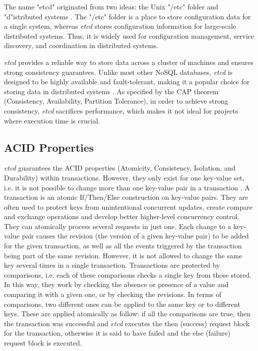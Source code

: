 \documentclass[screen,review]{acmart}
\begin{document}
The name "etcd" originated from two ideas: the Unix "/etc" folder and "d"istributed systems \cite{dbdb}. The "/etc" folder is a place to store configuration data for a single system, whereas \textit{etcd} stores configuration information for large-scale distributed systems. Thus, it is widely used for configuration management, service discovery, and coordination in distributed systems.

\textit{etcd} provides a reliable way to store data across a cluster of machines and ensures strong consistency guarantees. Unlike most other NoSQL databases, \textit{etcd} is designed to be highly available and fault-tolerant, making it a popular choice for storing data in distributed systems \cite{ibm} \cite{etcd_overview}. As specified by the CAP theorem \cite{ibm_CAP} (Consistency, Availability, Partition Tolerance), in order to achieve strong consistency, \textit{etcd} sacrifices performance, which makes it not ideal for projects where execution time is crucial.

\subsection{ACID Properties}
\textit{etcd} guarantees the ACID properties \cite{acid} (Atomicity, Consistency, Isolation, and Durability) within transactions. However, they only exist for one key-value set, i.e. it is not possible to change more than one key-value pair in a transaction \cite{transaction}.
A transaction is an atomic If/Then/Else construction on key-value pairs. They are often used to protect keys from unintentional concurrent updates, create compare and exchange operations and develop better higher-level concurrency control.
They can atomically process several requests in just one. Each change to a key-value pair causes the revision (the version of a given key-value pair) to be added for the given transaction, as well as all the events triggered by the transaction being part of the same revision. However, it is not allowed to change the same key several times in a single transaction.
Transactions are protected by comparisons, i.e. each of these comparisons checks a single key from those stored. In this way, they work by checking the absence or presence of a value and comparing it with a given one, or by checking the revisions. In terms of comparisons, two different ones can be applied to the same key or to different keys.
These are applied atomically as follow: if all the comparisons are true, then the transaction was successful and \textit{etcd} executes the then (success) request block for the transaction, otherwise it is said to have failed and the else (failure) request block is executed.
\end{document}
